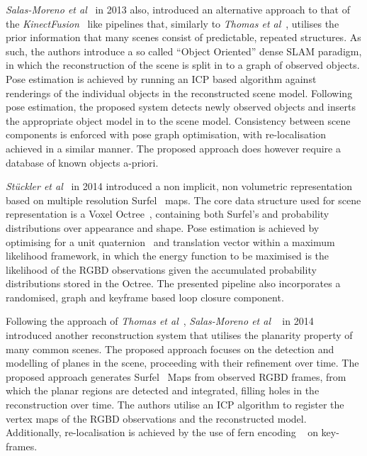 \textit{Salas-Moreno et al}~\cite{Salas-Moreno2013} in 2013 also, introduced an alternative 
approach to that of the \textit{KinectFusion}~\cite{Newcombe2011} like pipelines that, similarly to 
\textit{Thomas et al}~\cite{Thomas2013}, utilises the prior information that many scenes consist 
of predictable, repeated structures. As such, the authors introduce a so called ``Object Oriented'' 
dense SLAM paradigm, in which the reconstruction of the scene is split in to a graph of observed 
objects. Pose estimation is achieved by running an ICP based algorithm against renderings of the 
individual objects in the reconstructed scene model. Following pose estimation, the proposed 
system detects newly observed objects and inserts the appropriate object model in to the scene 
model. Consistency between scene components is enforced with pose graph optimisation, with 
re-localisation achieved in a similar manner. The proposed approach does however require a 
database of known objects a-priori.

\textit{St{\"u}ckler et al}~\cite{Stuckler2014} in 2014 introduced a non implicit, non volumetric 
representation based on multiple resolution Surfel~\cite{Pfister2000} maps. The core data structure 
used for scene representation is a Voxel Octree~\cite{Laine2010}, containing both Surfel's and 
probability distributions over appearance and shape. Pose estimation is achieved by optimising for 
a unit quaternion~\cite{Mukundan2002} and translation vector within a maximum likelihood framework, 
in which the energy function to be maximised is the likelihood of the RGBD observations given the 
accumulated probability distributions stored in the Octree. The presented pipeline also incorporates 
a randomised, graph and keyframe based loop closure component.

Following the approach of \textit{Thomas et al}~\cite{Thomas2013}, \textit{Salas-Moreno et al} 
~\cite{Salas-Moreno2014} in 2014 introduced another reconstruction system that utilises the
planarity property of many common scenes. The proposed approach focuses on the detection and 
modelling of planes in the scene, proceeding with their refinement over time. 
The proposed approach generates Surfel~\cite{Pfister2000} Maps from observed RGBD frames, from 
which the planar regions are detected and integrated, filling holes in the reconstruction over time.
The authors utilise an ICP algorithm to register the vertex maps of the RGBD observations and the 
reconstructed model. Additionally, re-localisation is achieved by the use of fern encoding 
~\cite{Glocker2014} on key-frames. 

